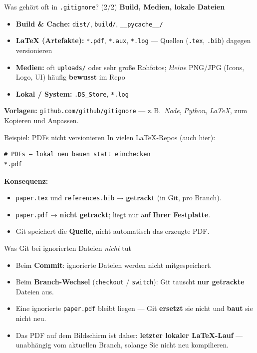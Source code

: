 \documentclass{beamer}
\begin{document}
\begin{frame}{Was gehört oft in \texttt{.gitignore}? (2/2)}
\textbf{Build, Medien, lokale Dateien}
\begin{itemize}
\item \textbf{Build \& Cache:} \texttt{dist/}, \texttt{build/}, \texttt{\_\_pycache\_\_/}
\item \textbf{LaTeX (Artefakte):} \texttt{*.pdf}, \texttt{*.aux}, \texttt{*.log} — Quellen (\texttt{.tex}, \texttt{.bib}) dagegen versionieren
\item \textbf{Medien:} oft \texttt{uploads/} oder sehr große Rohfotos; \emph{kleine} PNG/JPG (Icons, Logo, UI) häufig \textbf{bewusst} im Repo
\item \textbf{Lokal / System:} \texttt{.DS\_Store}, \texttt{*.log}
\end{itemize}
\vspace{0.3em}
\textbf{Vorlagen:} \texttt{github.com/github/gitignore} — z.\,B.\ \emph{Node}, \emph{Python}, \emph{LaTeX}, zum Kopieren und Anpassen.
\end{frame}

\begin{frame}[fragile]{Beispiel: PDFs nicht versionieren}
In vielen LaTeX-Repos (auch hier):
\begin{verbatim}
# PDFs — lokal neu bauen statt einchecken
*.pdf
\end{verbatim}
\vspace{0.4em}
\textbf{Konsequenz:}
\begin{itemize}
\item \texttt{paper.tex} und \texttt{references.bib} → \textbf{getrackt} (in Git, pro Branch).
\item \texttt{paper.pdf} → \textbf{nicht getrackt}; liegt nur auf \textbf{Ihrer Festplatte}.
\item Git speichert die \textbf{Quelle}, nicht automatisch das erzeugte PDF.
\end{itemize}
\end{frame}

\begin{frame}{Was Git bei ignorierten Dateien \emph{nicht} tut}
\begin{itemize}
\item Beim \textbf{Commit}: ignorierte Dateien werden nicht mitgespeichert.
\item Beim \textbf{Branch-Wechsel} (\texttt{checkout} / \texttt{switch}): Git tauscht \textbf{nur getrackte} Dateien aus.
\item Eine ignorierte \texttt{paper.pdf} bleibt liegen — Git \textbf{ersetzt} sie nicht und \textbf{baut} sie nicht neu.
\item Das PDF auf dem Bildschirm ist daher: \textbf{letzter lokaler LaTeX-Lauf} — unabhängig vom aktuellen Branch, solange Sie nicht neu kompilieren.
\end{itemize}
\end{frame}
\end{document}
